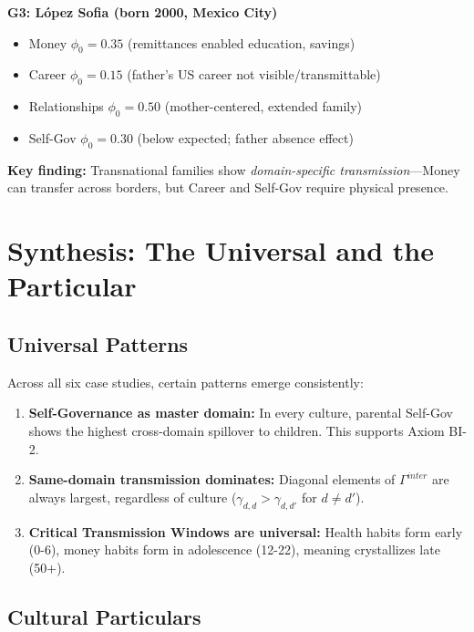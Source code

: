 \textbf{G3: López Sofia (born 2000, Mexico City)}
\begin{itemize}[nosep]
\item Money $\phi_0 = 0.35$ (remittances enabled education, savings)
\item Career $\phi_0 = 0.15$ (father's US career not visible/transmittable)
\item Relationships $\phi_0 = 0.50$ (mother-centered, extended family)
\item Self-Gov $\phi_0 = 0.30$ (below expected; father absence effect)
\end{itemize}

\textbf{Key finding:} Transnational families show \textit{domain-specific transmission}---Money can
transfer across borders, but Career and Self-Gov require physical presence.


\section{Synthesis: The Universal and the Particular}
\label{sec:BI-synthesis}

\subsection{Universal Patterns}

Across all six case studies, certain patterns emerge consistently:

\begin{enumerate}
\item \textbf{Self-Governance as master domain:} In every culture, parental Self-Gov shows
the highest cross-domain spillover to children. This supports Axiom BI-2.

\item \textbf{Same-domain transmission dominates:} Diagonal elements of $\Gamma^{inter}$ are
always largest, regardless of culture ($\gamma_{d,d} > \gamma_{d,d'}$ for $d \neq d'$).

\item \textbf{Critical Transmission Windows are universal:} Health habits form early (0-6),
money habits form in adolescence (12-22), meaning crystallizes late (50+).
\end{enumerate}

\subsection{Cultural Particulars}

